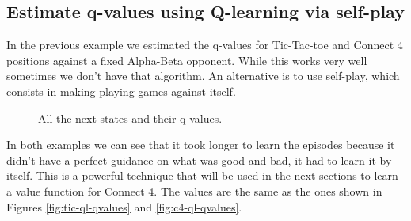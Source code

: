 \documentclass{article}
\begin{document}
\subsection{Estimate q-values using Q-learning via self-play}

In the previous example we estimated the q-values for Tic-Tac-toe and Connect 4 positions against a
fixed Alpha-Beta opponent. While this works very well sometimes we don't have that algorithm. An
alternative is to use self-play, which consists in making playing games against itself.



\begin{figure}[!h]
    \centering
     \hspace{0.1in}
    \caption{All the next states and their q values.}
    \label{fig:ql-tab-simple-selfplay-progress}
\end{figure}


In both examples we can see that it took longer to learn the episodes because it didn't have a
perfect guidance on what was good and bad, it had to learn it by itself. This is a powerful
technique that will be used in the next sections to learn a value function for Connect 4. The values
are the same as the ones shown in Figures \hyperref[fig:tic-ql-qvalues]{\ref*{fig:tic-ql-qvalues}}
and \hyperref[fig:c4-ql-qvalues]{\ref*{fig:c4-ql-qvalues}}.
\end{document}

